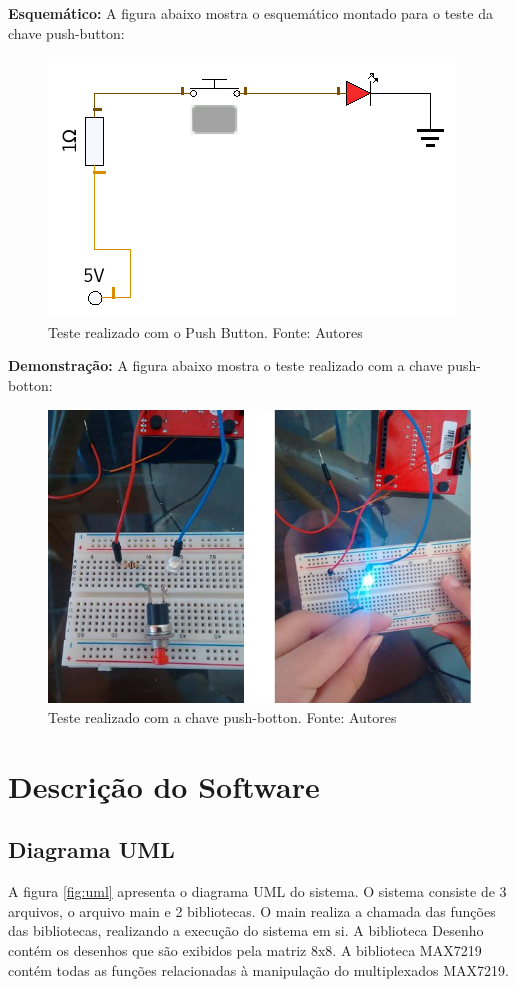 \documentclass[conference]{IEEEtran}
\begin{document}
\textbf{Esquemático:}
A figura abaixo mostra o esquemático montado para o teste da chave push-button:

\begin{figure}[H]
  \centering
  \includegraphics[width=0.5\linewidth]{esq1}
  \caption{Teste realizado com o Push Button. Fonte: Autores}
  \label{fig:dem_push}
\end{figure}

\textbf{Demonstração:}
A figura abaixo mostra o teste realizado com a chave push-botton:
\begin{figure}[H]
  \centering
  \includegraphics[width=0.5\linewidth]{push-bottom}
  \caption{Teste realizado com a chave push-botton. Fonte: Autores}
  \label{fig:dem_push_botton}
\end{figure}

\section{Descrição do Software}
\subsection{Diagrama UML}
A figura \ref{fig:uml} apresenta o diagrama UML do sistema. O sistema consiste de 3 arquivos, o arquivo main e 2 bibliotecas. O main realiza a chamada das funções das bibliotecas, realizando a execução do sistema em si. A biblioteca Desenho contém os desenhos que são exibidos pela matriz 8x8. A biblioteca MAX7219 contém todas as funções relacionadas à manipulação do multiplexados MAX7219. 
\end{document}
